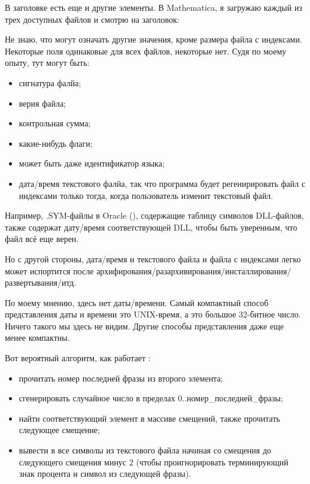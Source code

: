 В заголовке есть еще и другие элементы.
В Mathematica, я загружаю каждый из трех доступных файлов и смотрю на заголовок:

\begin{figure}[H]
\centering
{}
\end{figure}

Не знаю, что могут означать другие значения, кроме размера файла с индексами.
Некоторые поля одинаковые для всех файлов, некоторые нет.
Судя по моему опыту, тут могут быть:

\begin{itemize}
\item сигнатура фалйа;
\item верия файла;
\item контрольная сумма;
\item какие-нибудь флаги;
\item может быть даже идентификатор языка;
\item дата/время текстового фалйа, так что программа  будет регенирировать файл с индексами только тогда, когда
пользователь изменит текстовый файл.
\end{itemize}

Например, .SYM-файлы в Oracle (), содержащие таблицу символов DLL-файлов,
также содержат дату/время соответствующей DLL, чтобы быть уверенным, что файл всё еще верен.

Но с другой стороны, дата/время и текстового файла и файла с индексами легко может испортится после
архифирования/разархивирования/инсталлирования/развертывания/итд.

По моему мнению, здесь нет даты/времени. Самый компактный способ представления даты и времени это UNIX-время,
а это большое 32-битное число. Ничего такого мы здесь не видим. Другие способы представления даже еще менее компактны.

Вот вероятный алгоритм, как работает :

\begin{itemize}
\item прочитать номер последней фразы из второго элемента;
\item сгенерировать случайное число в пределах 0..номер\_последней\_фразы;
\item найти соответствующий элемент в массиве смещений, также прочитать следующее смещение;
\item вывести в  все символы из текстового файла начиная со смещения до следующего смещения минус 2 (чтобы
проигнорировать терминирующий знак процента и символ из следующей фразы).
\end{itemize}

